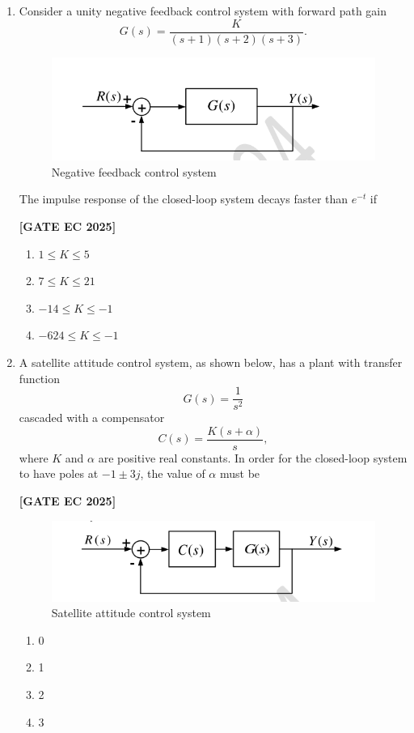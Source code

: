 \documentclass[12pt]{article}
\begin{document}
\begin{enumerate}[leftmargin=1.5em, label=\textbf{Q.\arabic*}., itemsep=2em]
\item Consider a unity negative feedback control system with forward path gain
\[
G(s) = \frac{K}{(s+1)(s+2)(s+3)}.
\]
\begin{figure}[H]\centering
\includegraphics[width=0.65\columnwidth]{figs/q37.png}
\caption{Negative feedback control system}
\label{fig:q37}
\end{figure}
The impulse response of the closed-loop system decays faster than $e^{-t}$ if

\noindent \textbf{[GATE EC 2025]}
\begin{multicols}{2}
\begin{enumerate}
    \item $1 \leq K \leq 5$
    \item $7 \leq K \leq 21$
    \item $-14 \leq K \leq -1$
    \item $-624 \leq K \leq -1$
\end{enumerate}
\end{multicols}

\item A satellite attitude control system, as shown below, has a plant with transfer function
\[
G(s) = \frac{1}{s^2}
\]
cascaded with a compensator
\[
C(s) = \frac{K(s+\alpha)}{s},
\]
where $K$ and $\alpha$ are positive real constants. In order for the closed-loop system to have poles at $-1 \pm 3j$, the value of $\alpha$ must be

\noindent \textbf{[GATE EC 2025]}
\begin{figure}[H]\centering
\includegraphics[width=0.65\columnwidth]{figs/q38.png}
\caption{Satellite attitude control system}
\label{fig:q38}
\end{figure}
\begin{multicols}{2}
\begin{enumerate}
    \item 0
    \item 1
    \item 2
    \item 3
\end{enumerate}
\end{multicols}


\end{enumerate}
\end{document}

